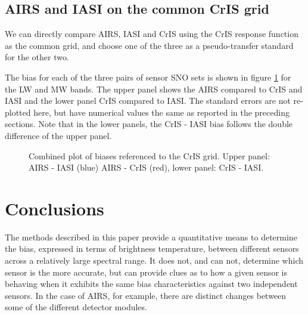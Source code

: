 \documentclass[twocolumn,10pt]{article}
\begin{document}
\subsection{AIRS and IASI on the common CrIS grid}
 We can directly compare AIRS, IASI and CrIS using the CrIS response function as the common grid, and choose one of the three as a pseudo-transfer standard for the other two.

The bias for each of the three pairs of sensor SNO sets is shown in figure \ref{fig:U1} for the LW and MW bands. The upper panel shows the AIRS compared to CrIS and IASI and the lower panel CrIS compared to IASI.  The standard errors are not re-plotted here, but have numerical values the same as reported in the preceding sections. Note that in the lower panels, the CrIS - IASI bias follows the double difference of the upper panel.  


\begin{figure}[htb]
  \centering
  \caption{ Combined plot of biases referenced to the CrIS grid. Upper panel: AIRS - IASI (blue) AIRS - CrIS (red), lower panel: CrIS - IASI.}
  \label{fig:U1}
\end{figure}


\section{Conclusions}
The methods described in this paper provide a quantitative means to determine the bias, expressed in terms of brightness temperature, between different sensors across a relatively large spectral range. It does not, and can not, determine which sensor is the more accurate, but can provide clues as to how a given sensor is behaving when it exhibits the same bias characteristics against two independent sensors. In the case of AIRS, for example, there are distinct changes between some of the different detector modules.
\end{document}
